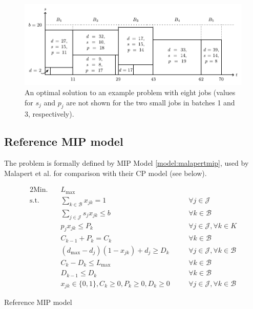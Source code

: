 \documentclass[oribibl]{llncs}
\def\Lmax{{L_{\mathrm{max}}}}
\begin{document}
\begin{figure}[th]
\centering
\includegraphics[width=\textwidth]{tetris.pdf}
\caption{An optimal solution to an example problem with eight jobs (values for
  $s_j$ and $p_j$ are not shown for the two small jobs in batches 1 and 3,
respectively).}
  \label{fig:intro_tetris}
\end{figure}

\subsection{Reference MIP model} The problem is formally defined by MIP
Model \ref{model:malapertmip}, used by Malapert et al. \cite{Malapert} for comparison
with their CP model (see below).

\begin{model}[h]
\begin{alignat}{2}
\mathrm{Min.}\quad & \Lmax && \\
\mathrm{s.t.}\quad &\sum_{k \in \mathcal{B}} x_{jk} = 1 \quad && \forall j \in \mathcal{J}
\label{c:malapp-unique}\\
  &\sum_{j \in \mathcal{J}} s_j x_{jk} \leq b \quad && \forall k \in \mathcal{B}\label{c:malapp-cap}\\
  &p_j x_{jk} \leq P_k \quad && \forall j \in \mathcal{J}, \forall k \in
  K\label{c:malapp-pk}\\
  &C_{k-1} + P_{k} = C_k \quad && \forall k \in \mathcal{B}\label{c:malapp-ck}\\
  &(d_\mathrm{max} - d_j)(1 - x_{jk}) + d_j \geq D_k \quad && \forall j \in \mathcal{J}, \forall
  k \in \mathcal{B}\label{c:malapp-dk}\\
&C_k - D_k \leq \Lmax \quad && \forall k \in \mathcal{B}\label{c:malapp-lmax}\\
  &D_{k-1} \leq D_k \quad && \forall k \in \mathcal{B} \label{c:malapp-edd} \\%
  &x_{jk} \in \{0,1\}, C_k \geq 0, P_k \geq 0, D_k \geq 0 \quad && \forall j \in \mathcal{J}, \forall k \in \mathcal{B}  
\end{alignat}
\caption{Reference MIP model}
\label{model:malapertmip}
\end{model}
\end{document}
